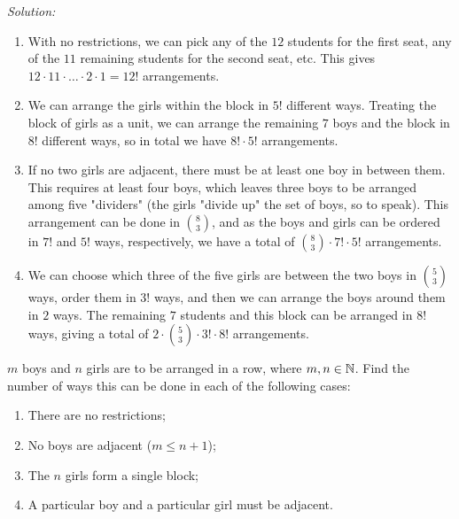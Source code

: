 \documentclass[12pt]{scrartcl}
\newenvironment{problem}[2][Problem]{\begin{trivlist}
\item[\hskip \labelsep {\bfseries #1}\hskip \labelsep {\bfseries #2.}]}{\end{trivlist}}
\newenvironment{sol}
    {\emph{Solution:}
    }
    {
    \qedhere
    }
\begin{document}
\begin{sol}
\begin{enumerate}[label=(\roman*)]
\item With no restrictions, we can pick any of the $12$ students for the first seat, any of the $11$ remaining students for the second seat, etc. This gives $12 \cdot 11 \cdot \ldots \cdot 2 \cdot 1 = \boxed{12!}$ arrangements. 
\item We can arrange the girls within the block in $5!$ different ways. Treating the block of girls as a unit, we can arrange the remaining $7$ boys and the block in $8!$ different ways, so in total we have $\boxed{8! \cdot 5!}$ arrangements. 
\item If no two girls are adjacent, there must be at least one boy in between them. This requires at least four boys, which leaves three boys to be arranged among five "dividers" (the girls "divide up" the set of boys, so to speak). This arrangement can be done in $\binom{8}{3}$, and as the boys and girls can be ordered in $7!$ and $5!$ ways, respectively, we have a total of $\boxed{\binom{8}{3} \cdot 7! \cdot 5!}$ arrangements. 
\item We can choose which three of the five girls are between the two boys in $\binom{5}{3}$ ways, order them in $3!$ ways, and then we can arrange the boys around them in $2$ ways. The remaining $7$ students and this block can be arranged in $8!$ ways, giving a total of $\boxed{2 \cdot \binom{5}{3} \cdot 3! \cdot 8!}$ arrangements. 
\end{enumerate}
\end{sol}

\begin{problem}{3}
$m$ boys and $n$ girls are to be arranged in a row, where $m, n \in \mathbb N$. Find the number of ways this can be done in each of the following cases: 
\begin{enumerate}[label=(\roman*)]
\item There are no restrictions;
\item No boys are adjacent ($m \leq n+1$); 
\item The $n$ girls form a single block;
\item A particular boy and a particular girl must be adjacent.  
\end{enumerate}
\end{problem}
\end{document}
